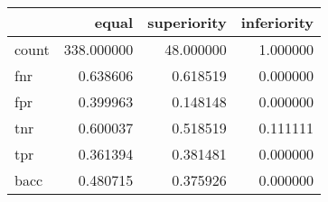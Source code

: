 \begin{tabular}{lrrr}
\toprule
{} &       equal &  superiority &  inferiority \\
\midrule
count &  338.000000 &    48.000000 &     1.000000 \\
fnr   &    0.638606 &     0.618519 &     0.000000 \\
fpr   &    0.399963 &     0.148148 &     0.000000 \\
tnr   &    0.600037 &     0.518519 &     0.111111 \\
tpr   &    0.361394 &     0.381481 &     0.000000 \\
bacc  &    0.480715 &     0.375926 &     0.000000 \\
\bottomrule
\end{tabular}
